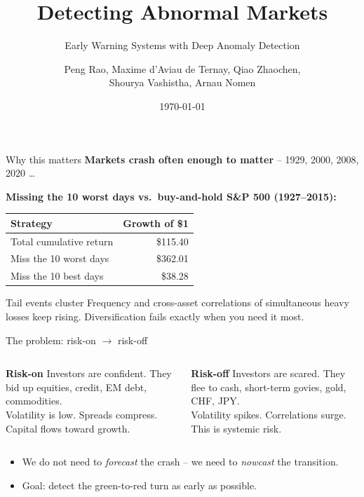 \documentclass[10pt,aspectratio=169]{beamer}
\title{Detecting Abnormal Markets}
\subtitle{Early Warning Systems with Deep Anomaly Detection}
\date{\today}
\author[Peng Rao et al.]{\texorpdfstring{\scriptsize Peng Rao, Maxime d'Aviau de Ternay, Qiao Zhaochen,\\ Shourya Vashistha, Arnau Nomen}{Peng Rao et al.}}
\institute{Politecnico di Milano}
\begin{document}
\maketitle

\begin{frame}{Why this matters}
	\textbf{Markets crash often enough to matter} -- 1929, 2000, 2008, 2020 \dots
	\vspace{0.6em}

	\textbf{Missing the 10 worst days vs.\ buy-and-hold S\&P 500 (1927--2015):}
	\begin{center}
		\begin{tabular}{lr}
			\toprule
			Strategy                & Growth of \$1      \\
			\midrule
			Total cumulative return & \$115.40           \\
			Miss the 10 worst days  & \$362.01           \\
			Miss the 10 best days   & \phantom{0}\$38.28 \\
			\bottomrule
		\end{tabular}
	\end{center}
	\vspace{0.4em}

	\begin{alertblock}{Tail events cluster}
		Frequency and cross-asset correlations of simultaneous heavy losses keep rising.
		Diversification fails exactly when you need it most.
	\end{alertblock}
\end{frame}

\begin{frame}{The problem: risk-on $\rightarrow$ risk-off}
	\begin{columns}[T,onlytextwidth]
		\begin{block}{\color{riskon}\textbf{Risk-on}}
			Investors are confident. They bid up equities, credit, EM debt, commodities. \\[0.3em]
			Volatility is low. Spreads compress. Capital flows toward growth.
		\end{block}
		\begin{block}{\color{riskoff}\textbf{Risk-off}}
			Investors are scared. They flee to cash, short-term govies, gold, CHF, JPY. \\[0.3em]
			Volatility spikes. Correlations surge. This is systemic risk.
		\end{block}
	\end{columns}
	\vspace{0.6em}
	\begin{itemize}
		\item We do not need to \emph{forecast} the crash -- we need to \emph{nowcast} the transition.
		\item Goal: detect the green-to-red turn as early as possible.
	\end{itemize}
\end{frame}
\end{document}
